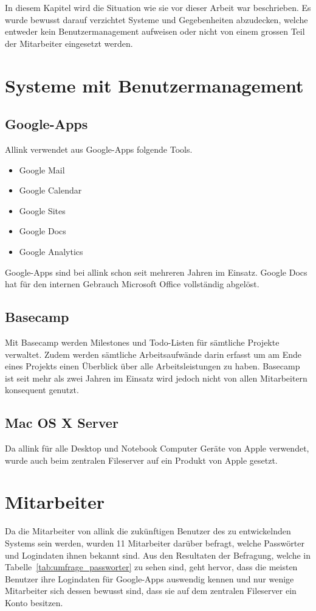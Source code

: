In diesem Kapitel wird die Situation wie sie vor dieser Arbeit war beschrieben. Es wurde bewusst darauf verzichtet Systeme und Gegebenheiten abzudecken, welche entweder kein Benutzermanagement aufweisen oder nicht von einem grossen Teil der Mitarbeiter eingesetzt werden.

\section{Systeme mit Benutzermanagement}
\label{sec:Systeme mit Benutzermanagement}

\subsection{Google-Apps}
\label{subs:Google-Apps}
Allink verwendet aus Google-Apps folgende Tools. 
\begin{itemize}
	\item Google Mail 
	\item Google Calendar 
	\item Google Sites 
	\item Google Docs 
	\item Google Analytics 
\end{itemize}
Google-Apps sind bei allink schon seit mehreren Jahren im Einsatz. Google Docs hat für den internen Gebrauch Microsoft Office vollständig abgelöst.

\subsection{Basecamp}
\label{subs:Basecamp}
Mit Basecamp werden Milestones und Todo-Listen für sämtliche Projekte verwaltet. Zudem werden sämtliche Arbeitsaufwände darin erfasst um am Ende eines Projekts einen Überblick über alle Arbeitsleistungen zu haben. Basecamp ist seit mehr als zwei Jahren im Einsatz wird jedoch nicht von allen Mitarbeitern konsequent genutzt.

\subsection{Mac OS X Server}
\label{subs:Mac OS X Server}
Da allink für alle Desktop und Notebook Computer Geräte von Apple verwendet, wurde auch beim zentralen Fileserver auf ein Produkt von Apple gesetzt.

\section{Mitarbeiter}
\label{sec:Mitarbeiter}
Da die Mitarbeiter von allink die zukünftigen Benutzer des zu entwickelnden Systems sein werden, wurden 11 Mitarbeiter darüber befragt, welche Passwörter und Logindaten ihnen bekannt sind. Aus den Resultaten der Befragung, welche in Tabelle~\ref{tab:umfrage_passworter} zu sehen sind, geht hervor, dass die meisten Benutzer ihre Logindaten für Google-Apps auswendig kennen und nur wenige Mitarbeiter sich dessen bewusst sind, dass sie auf dem zentralen Fileserver ein Konto besitzen.


